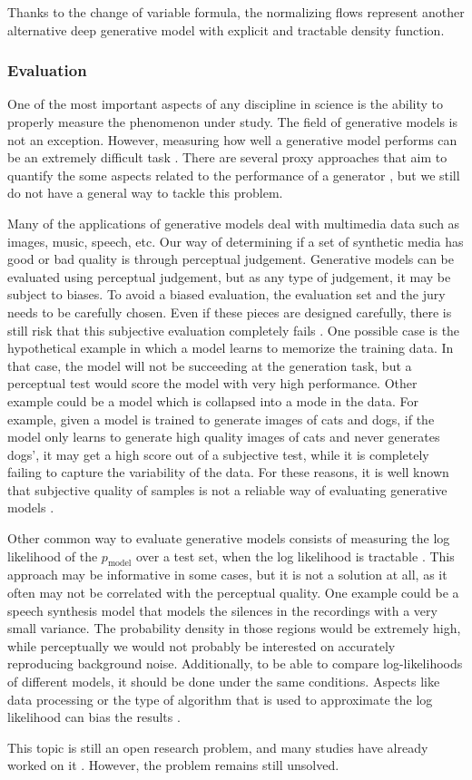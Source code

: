 Thanks to the change of variable formula, the normalizing flows represent another alternative deep generative model with explicit and tractable density function.

\subsubsection{Evaluation} \label{sec:dgmevaluation}
One of the most important aspects of any discipline in science is the ability to properly measure the phenomenon under study. The field of generative models is not an exception. However, measuring how well a generative model performs can be an extremely difficult task \autocite{Goodfellow2016}. There are several proxy approaches that aim to quantify the some aspects related to the performance of a generator \autocite{theis2016a}, but we still do not have a general way to tackle this problem.

Many of the applications of generative models deal with multimedia data such as images, music, speech, etc. Our way of determining if a set of synthetic media has good or bad quality is through perceptual judgement. Generative models can be evaluated using perceptual judgement, but as any type of judgement, it may be subject to biases. To avoid a biased evaluation, the evaluation set and the jury needs to be carefully chosen. Even if these pieces are designed carefully, there is still risk that this subjective evaluation completely fails \autocite{Goodfellow2016}. One possible case is the hypothetical example in which a model learns to memorize the training data. In that case, the model will not be succeeding at the generation task, but a perceptual test would score the model with very high performance. Other example could be a model which is collapsed into a mode in the data. For example, given a model is trained to generate images of cats and dogs, if the model only learns to generate high quality images of cats and never generates dogs', it may get a high score out of a subjective test, while it is completely failing to capture the variability of the data. For these reasons, it is well known that subjective quality of samples is not a reliable way of evaluating generative models \autocite{denton2015}.

Other common way to evaluate generative models consists of measuring the log likelihood of the $p_\mathrm{model}$ over a test set, when the log likelihood is tractable \autocite{Goodfellow2016}. This approach may be informative in some cases, but it is not a solution at all, as it often may not be correlated with the perceptual quality. One example could be a speech synthesis model that models the silences in the recordings with a very small variance. The probability density in those regions would be extremely high, while perceptually we would not probably be interested on accurately reproducing background noise. Additionally, to be able to compare log-likelihoods of different models, it should be done under the same conditions. Aspects like data processing or the type of algorithm that is used to approximate the log likelihood can bias the results \autocite{Goodfellow2016}.

This topic is still an open research problem, and many studies have already worked on it \autocite{theis2016a, sajjadi2018}. However, the problem remains still unsolved.



